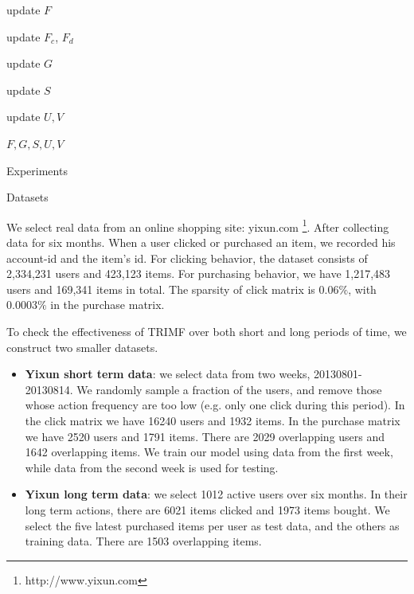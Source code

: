 \begin{section}
\begin{algorithm}[tb]
\begin{algorithmic}

\STATE update $F$

\STATE update $F_c$, $F_d$

\STATE  update $G$

\STATE  update $S$

\STATE  update $U, V$


\ENDFOR

 $F,G,S,U,V$

\end{algorithmic}
\label{algorithm:TRIMF}
\end{algorithm}

\end{section}
\begin{section}{Experiments}
  \begin{subsection}{Datasets}

We select real data from an online shopping site: yixun.com \footnote{http://www.yixun.com}. After collecting data for six months. When a user clicked or purchased an item, we recorded his account-id and the item's id. For clicking behavior, the dataset consists of 2,334,231 users and 423,123 items. For purchasing behavior, we have 1,217,483 users and 169,341 items in total. The sparsity of click matrix is $0.06\%$, with $0.0003\%$ in the purchase matrix.

To check the effectiveness of TRIMF over both short and long periods of time, we construct two smaller datasets.	

\begin{itemize}

\item \textbf{Yixun short term data}: we select data from two weeks, 20130801-20130814. We randomly sample a fraction of the users, and remove those whose action frequency are too low (e.g. only one click during this period). In the click matrix we have 16240 users and 1932 items. In the purchase matrix we have 2520 users and 1791 items. There are 2029 overlapping users and 1642 overlapping items. We train our model using data from the first week, while data from the second week is used for testing.
\item \textbf{Yixun long term data}: we select 1012 active users over six months. In their long term actions, there are 6021 items clicked and 1973 items bought. We select the five latest purchased items per user as test data, and the others as training data. There are 1503 overlapping items.

\end{itemize}
\end{subsection}


\end{section}
